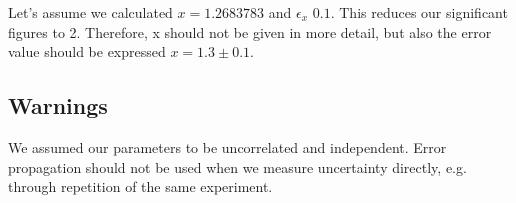 \documentclass[
10pt, %
a4paper, %
oneside, %
headinclude,footinclude, %
BCOR5mm, %
]{scrartcl}
\begin{document}
Let's assume we calculated $x=1.2683783$ and $\epsilon_x$ $0.1$. This reduces our significant figures to 2. Therefore, x should not be given in more detail, but also the error value should be expressed $x=1.3 \pm 0.1$.

\subsection{Warnings}

We assumed our parameters to be uncorrelated and independent. Error propagation should not be used when we measure uncertainty directly, e.g. through repetition of the same experiment.





\end{document}
